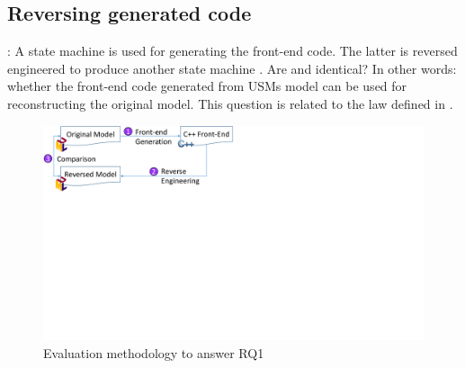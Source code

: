 \subsection{Reversing generated code}
\label{subsec:exp1}
: A state machine  is used for generating the front-end code. The latter is reversed engineered to produce another state machine . Are  and  identical? In other words: whether the front-end code generated from USMs model can be used for reconstructing the original model. This question is related to the  law defined in \cite{foster_combinators_2007}.

\begin{figure}
	\centering
	\includegraphics[clip, trim=0cm 13.1cm 16.2cm 0cm, width=\columnwidth]{figures/rteevaluation}
	\caption{Evaluation methodology to answer RQ1} 
	\label{fig:EvaluationStrategyBoth}
\end{figure}


